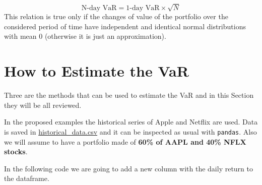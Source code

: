 \begin{equation}
\textrm{N-day VaR} = \textrm{1-day VaR}\times \sqrt{N}
\label{eq:var_horizon}
\end{equation}
This relation is true only if the changes of value of the portfolio over
the considered period of time have independent and identical normal
distributions with mean 0 (otherwise it is just an approximation).

\section{How to Estimate the VaR}\label{how-to-estimate-the-var}

Three are the methods that can be used to estimate the VaR and 
in this Section they will be all reviewed.

In the proposed examples the historical series of Apple and Netflix
are used. Data is saved in \href{https://drive.google.com/file/d/1pxzLjR_dsFdF3vildeh6vbmZJQmS6Qx7/view?usp=sharing}{historical\_data.csv}
and it can be inspected as usual with \texttt{pandas}.
Also we will assume to have a portfolio made of \textbf{60\% of AAPL and 40\% NFLX stocks}.

In the following code we are going to add a new column with the daily return to the dataframe.

